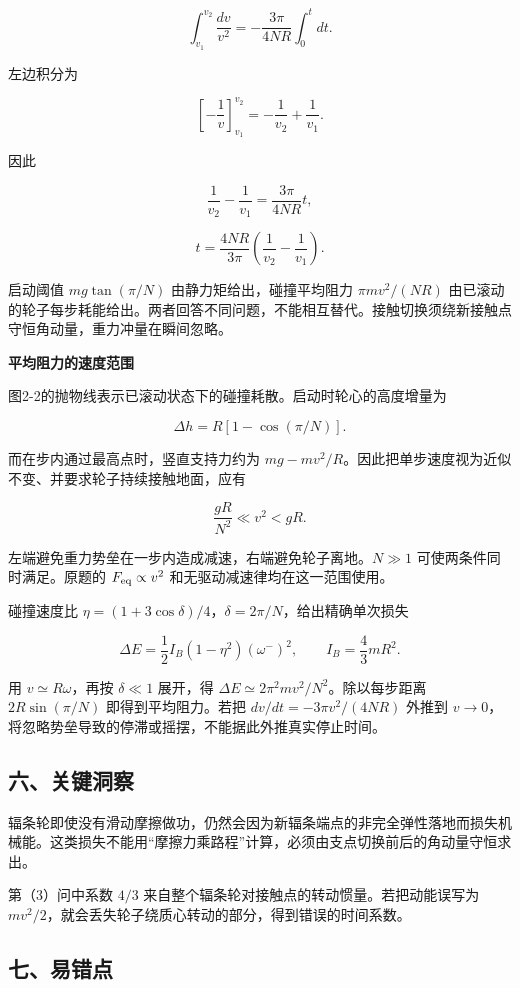 \documentclass[12pt,a4paper,UTF8]{ctexart}
\begin{document}
\[\int_{v_1}^{v_2}\frac{dv}{v^2}
=-\frac{3\pi}{4NR}\int_0^t dt.\]

左边积分为

\[\left[-\frac1v\right]_{v_1}^{v_2}
=-\frac1{v_2}+\frac1{v_1}.\]

因此

\[\frac1{v_2}-\frac1{v_1}=\frac{3\pi}{4NR}t,\]

\[\boxed{t=\frac{4NR}{3\pi}
\left(\frac1{v_2}-\frac1{v_1}\right)}.\]

启动阈值 \(mg\tan(\pi/N)\) 由静力矩给出，碰撞平均阻力 \(\pi mv^2/(NR)\)
由已滚动的轮子每步耗能给出。两者回答不同问题，不能相互替代。接触切换须绕新接触点守恒角动量，重力冲量在瞬间忽略。

\textbf{平均阻力的速度范围}

图2-2的抛物线表示已滚动状态下的碰撞耗散。启动时轮心的高度增量为

\[\Delta h=R[1-\cos(\pi/N)].\]

而在步内通过最高点时，竖直支持力约为
\(mg-mv^2/R\)。因此把单步速度视为近似不变、并要求轮子持续接触地面，应有

\[\frac{gR}{N^2}\ll v^2<gR.\]

左端避免重力势垒在一步内造成减速，右端避免轮子离地。\(N\gg1\)
可使两条件同时满足。原题的 \(F_{\rm eq}\propto v^2\)
和无驱动减速律均在这一范围使用。

碰撞速度比
\(\eta=(1+3\cos\delta)/4\)，\(\delta=2\pi/N\)，给出精确单次损失

\[\Delta E=\frac12 I_B(1-\eta^2)(\omega^-)^2,
\qquad I_B=\frac43mR^2.\]

用 \(v\simeq R\omega\)，再按 \(\delta\ll1\) 展开，得
\(\Delta E\simeq2\pi^2mv^2/N^2\)。除以每步距离 \(2R\sin(\pi/N)\)
即得到平均阻力。若把 \(dv/dt=-3\pi v^2/(4NR)\) 外推到
\(v\to0\)，将忽略势垒导致的停滞或摇摆，不能据此外推真实停止时间。

\subsection{六、关键洞察}\label{ux516dux5173ux952eux6d1eux5bdf-1}

辐条轮即使没有滑动摩擦做功，仍然会因为新辐条端点的非完全弹性落地而损失机械能。这类损失不能用``摩擦力乘路程''计算，必须由支点切换前后的角动量守恒求出。

第（3）问中系数 \(4/3\) 来自整个辐条轮对接触点的转动惯量。若把动能误写为
\(mv^2/2\)，就会丢失轮子绕质心转动的部分，得到错误的时间系数。

\subsection{七、易错点}\label{ux4e03ux6613ux9519ux70b9-1}
\end{document}
